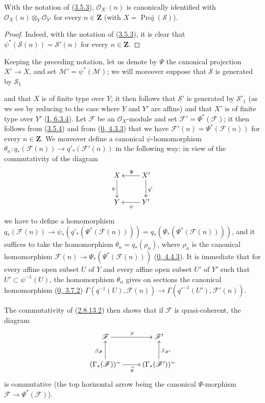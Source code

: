 \begin{corollary}[3.5.4]
\label{II.3.5.4}
With the notation of (\hyperref[II.3.5.3]{3.5.3}),
$\mathcal{O}_{X'}(n)$ is canonically identified with
$\mathcal{O}_X(n)\otimes_Y\mathcal{O}_{Y'}$ for every $n\in\mathbf{Z}$ (with
$X=\operatorname{Proj}(\mathcal{S})$).
\end{corollary}

\begin{proof}
Indeed, with the notation of (\hyperref[II.3.5.3]{3.5.3}), it is clear
that $\psi^*(\mathcal{S}(n))=\mathcal{S}'(n)$ for every $n\in\mathbf{Z}$.
\end{proof}

\begin{env}[3.5.5]
\label{II.3.5.5}
Keeping the preceding notation, let us denote by $\Psi$ the canonical
projection $X'\to X$, and set $\mathcal{M}'=\psi^*(\mathcal{M})$; we
will moreover suppose that $\mathcal{S}$ is generated by $\mathcal{S}_1$


and that $X$ is of finite type over $Y$; it then follows that $\mathcal{S}'$
is generated by $\mathcal{S}'_1$ (as we see by reducing to the case where
$Y$ and $Y'$ are affine) and that $X'$ is of finite type over $Y'$
(\hyperref[I.6.3.4]{I, 6.3.4}). Let $\mathcal{F}$ be an
$\mathcal{O}_X$-module and set $\mathcal{F}'=\Psi^*(\mathcal{F})$; it
then follows from (\hyperref[II.3.5.4]{3.5.4}) and from
(\hyperref[0.4.3.3]{0, 4.3.3}) that we have
$\mathcal{F}'(n)=\Psi^*(\mathcal{F}(n))$ for every $n\in\mathbf{Z}$. We
moreover define a canonical $\psi$-homomorphism
$\theta_n:q_*(\mathcal{F}(n))\to q'_*(\mathcal{F}'(n))$ in the following
way: in view of the commutativity of the diagram
\[
  \xymatrix{
    X\ar[d]_{q}
    & X'\ar[l]_{\Psi}\ar[d]^{q'}\\
    Y
    & Y'\ar[l]^{\psi}
  }
\]
we have to define a homomorphism
$q_*(\mathcal{F}(n))\to
\psi_*(q'_*(\Psi^*(\mathcal{F}(n))))
=q_*(\Psi_*(\Psi^*(\mathcal{F}(n))))$, and it suffices to take
the homomorphism $\theta_n=q_*(\rho_n)$, where $\rho_n$ is the canonical
homomorphism
$\mathcal{F}(n)\to\Psi_*(\Psi^*(\mathcal{F}(n)))$
(\hyperref[0.4.4.3]{0, 4.4.3}). It is immediate that for every affine open
subset $U$ of $Y$ and every affine open subset $U'$ of $Y'$ such that
$U'\subset\psi^{-1}(U)$, the homomorphism $\theta_n$ gives on sections
the canonical homomorphism (\hyperref[0.3.7.2]{0, 3.7.2})
$\Gamma(q^{-1}(U),\mathcal{F}(n))\to
\Gamma(q'^{-1}(U'),\mathcal{F}'(n))$.

The commutativity of (\hyperref[II.2.8.13.2]{2.8.13.2}) then shows that if
$\mathcal{F}$ is quasi-coherent, the diagram
\[
  \xymatrix{
    \mathcal{F}\ar[r]^{\rho}
    & \mathcal{F}'\\
    (\Gamma_*(\mathcal{F}))^{\sim}
      \ar[u]^{\beta_{\mathcal{F}}}\ar[r]_{\widetilde{\theta}}
    & (\Gamma_*(\mathcal{F}'))^{\sim}
      \ar[u]_{\beta_{\mathcal{F}'}}
  }
\]
is commutative (the top horizontal arrow being the canonical
$\Psi$-morphism $\mathcal{F}\to\Psi^*(\mathcal{F})$).


\end{env}
